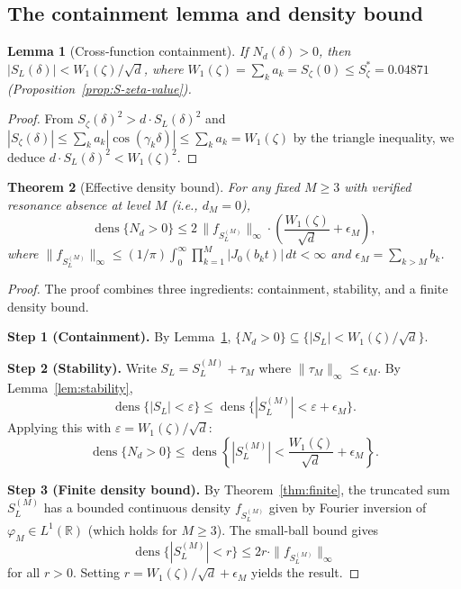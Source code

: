 \documentclass[12pt,reqno]{amsart}
\theoremstyle{plain}
\newtheorem{theorem}{Theorem}[section]
\newtheorem{lemma}[theorem]{Lemma}
\theoremstyle{definition}
\theoremstyle{remark}
\DeclareMathOperator{\dens}{dens}
\newcommand{\R}{\mathbb{R}}
\begin{document}
\subsection{The containment lemma and density bound}

\begin{lemma}[Cross-function containment]\label{lem:cross-containment}
If $N_d(\delta) > 0$, then $|S_L(\delta)| < W_1(\zeta)/\sqrt{d}$, where $W_1(\zeta) = \sum_k a_k = S_\zeta(0) \leq S_\zeta^* = 0.04871$ (Proposition~\ref{prop:S-zeta-value}).
\end{lemma}

\begin{proof}
From $S_\zeta(\delta)^2 > d\cdot S_L(\delta)^2$ and $|S_\zeta(\delta)| \leq \sum_k a_k |\cos(\gamma_k \delta)| \leq \sum_k a_k = W_1(\zeta)$ by the triangle inequality, we deduce $d\cdot S_L(\delta)^2 < W_1(\zeta)^2$.
\end{proof}

\begin{theorem}[Effective density bound]\label{thm:density}
For any fixed $M \geq 3$ with verified resonance absence at level $M$ (i.e., $d_M = 0$),
\[
  \dens\{N_d > 0\} \leq 2\,\|f_{S_L^{(M)}}\|_\infty \cdot \left(\frac{W_1(\zeta)}{\sqrt{d}} + \epsilon_M\right),
\]
where $\|f_{S_L^{(M)}}\|_\infty \leq (1/\pi)\int_0^\infty \prod_{k=1}^M |J_0(b_k t)|\, dt < \infty$ and $\epsilon_M = \sum_{k > M} b_k$.
\end{theorem}

\begin{proof}
The proof combines three ingredients: containment, stability, and a finite density bound.

\medskip\noindent\textbf{Step 1 (Containment).}
By Lemma~\ref{lem:cross-containment}, $\{N_d > 0\} \subseteq \{|S_L| < W_1(\zeta)/\sqrt{d}\}$.

\medskip\noindent\textbf{Step 2 (Stability).}
Write $S_L = S_L^{(M)} + \tau_M$ where $\|\tau_M\|_\infty \leq \epsilon_M$.  By Lemma~\ref{lem:stability},
\[
  \dens\{|S_L| < \varepsilon\} \leq \dens\{|S_L^{(M)}| < \varepsilon + \epsilon_M\}.
\]
Applying this with $\varepsilon = W_1(\zeta)/\sqrt{d}$:
\[
  \dens\{N_d > 0\} \leq \dens\left\{|S_L^{(M)}| < \frac{W_1(\zeta)}{\sqrt{d}} + \epsilon_M\right\}.
\]

\medskip\noindent\textbf{Step 3 (Finite density bound).}
By Theorem~\ref{thm:finite}, the truncated sum $S_L^{(M)}$ has a bounded continuous density $f_{S_L^{(M)}}$ given by Fourier inversion of $\varphi_M \in L^1(\R)$ (which holds for $M \geq 3$).  The small-ball bound gives
\[
  \dens\{|S_L^{(M)}| < r\} \leq 2r \cdot \|f_{S_L^{(M)}}\|_\infty
\]
for all $r > 0$.  Setting $r = W_1(\zeta)/\sqrt{d} + \epsilon_M$ yields the result.
\end{proof}
\end{document}
